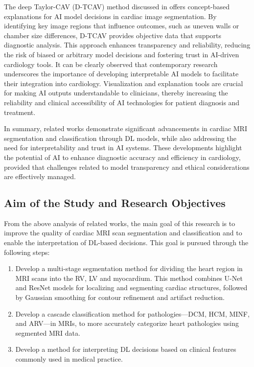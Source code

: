 \documentclass[fleqn,10pt]{wlscirep}
\begin{document}
The deep Taylor-CAV (D-TCAV) method discussed in \cite{Janik:2021} offers concept-based explanations for AI model decisions in cardiac image segmentation. By identifying key image regions that influence outcomes, such as uneven walls or chamber size differences, D-TCAV provides objective data that supports diagnostic analysis. This approach enhances transparency and reliability, reducing the risk of biased or arbitrary model decisions and fostering trust in AI-driven cardiology tools. It can be clearly observed that contemporary research underscores the importance of developing interpretable AI models to facilitate their integration into cardiology. Visualization and explanation tools are crucial for making AI outputs understandable to clinicians, thereby increasing the reliability and clinical accessibility of AI technologies for patient diagnosis and treatment.

In summary, related works demonstrate significant advancements in cardiac MRI segmentation and classification through DL models, while also addressing the need for interpretability and trust in AI systems. These developments highlight the potential of AI to enhance diagnostic accuracy and efficiency in cardiology, provided that challenges related to model transparency and ethical considerations are effectively managed.

\subsection*{Aim of the Study and Research Objectives}

From the above analysis of related works, the main goal of this research is to improve the quality of cardiac MRI scan segmentation and classification and to enable the interpretation of DL-based decisions. This goal is pursued through the following steps:

\begin{enumerate}
    \item Develop a multi-stage segmentation method for dividing the heart region in MRI scans into the RV, LV and myocardium. This method combines U-Net and ResNet models for localizing and segmenting cardiac structures, followed by Gaussian smoothing for contour refinement and artifact reduction.
    \item Develop a cascade classification method for pathologies—DCM, HCM, MINF, and ARV—in MRIs, to more accurately categorize heart pathologies using segmented MRI data.
    \item Develop a method for interpreting DL decisions based on clinical features commonly used in medical practice.
\end{enumerate}
\end{document}
